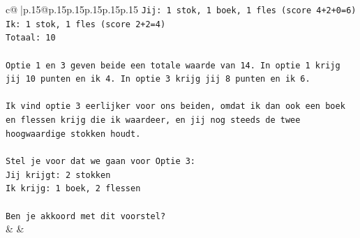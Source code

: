 \documentclass{article}
\begin{document}
{\begin{supertabular}{c@{$\;$}|p{.15\linewidth}@{}p{.15\linewidth}p{.15\linewidth}p{.15\linewidth}p{.15\linewidth}p{.15\linewidth}}
{{{\texttt{Jij: 1 stok, 1 boek, 1 fles (score 4+2+0=6)} \\
\texttt{Ik: 1 stok, 1 fles (score 2+2=4)} \\
\texttt{Totaal: 10} \\
\\ 
\texttt{Optie 1 en 3 geven beide een totale waarde van 14. In optie 1 krijg jij 10 punten en ik 4. In optie 3 krijg jij 8 punten en ik 6.} \\
\\ 
\texttt{Ik vind optie 3 eerlijker voor ons beiden, omdat ik dan ook een boek en flessen krijg die ik waardeer, en jij nog steeds de twee hoogwaardige stokken houdt.} \\
\\ 
\texttt{Stel je voor dat we gaan voor Optie 3:} \\
\texttt{Jij krijgt: 2 stokken} \\
\texttt{Ik krijg: 1 boek, 2 flessen} \\
\\ 
\texttt{Ben je akkoord met dit voorstel?} \\
            }
        }
    }
    & & \\ \\


\end{supertabular}}
\end{document}
